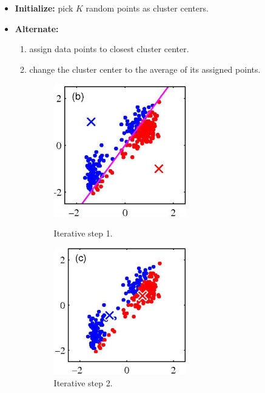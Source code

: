 \begin{itemize}
	\item \textbf{Initialize:} pick $K$ random points as cluster centers.
	\item \textbf{Alternate:}
	\begin{enumerate}
		\item assign data points to closest cluster center.
		\item change the cluster center to the average of its assigned points.
		\begin{figure}[H]
			\begin{minipage}[t]{0.42\linewidth} 
				\centering
				\includegraphics[width=0.58\textwidth]{img/kmeans2}
				\caption{Iterative step 1.}
			\end{minipage}        
			\hspace{2.5cm}
			\begin{minipage}[t]{0.42\linewidth} 
				\centering
				\includegraphics[width=0.58\textwidth]{img/kmeans3}
				\caption{Iterative step 2.}
			\end{minipage}

\end{figure}
\end{enumerate}
\end{itemize}
